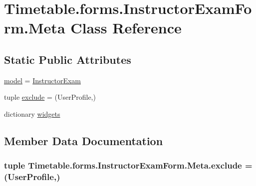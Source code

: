 \hypertarget{classTimetable_1_1forms_1_1InstructorExamForm_1_1Meta}{}\section{Timetable.\+forms.\+Instructor\+Exam\+Form.\+Meta Class Reference}
\label{classTimetable_1_1forms_1_1InstructorExamForm_1_1Meta}
\subsection*{Static Public Attributes}
\begin{DoxyCompactItemize}
\item 
\hyperlink{classTimetable_1_1forms_1_1InstructorExamForm_1_1Meta_a34a1ffa63c45106f0bd42087cdd17b5c}{model} = \hyperlink{classTimetable_1_1models_1_1InstructorExam}{Instructor\+Exam}
\item 
tuple \hyperlink{classTimetable_1_1forms_1_1InstructorExamForm_1_1Meta_adcd50d8708b6b512b420b85350d070b9}{exclude} = (\textquotesingle{}User\+Profile\textquotesingle{},)
\item 
dictionary \hyperlink{classTimetable_1_1forms_1_1InstructorExamForm_1_1Meta_a465e32885f71d0c5718e8d2d9836af9b}{widgets}
\end{DoxyCompactItemize}


\subsection{Member Data Documentation}
\subsubsection[{\texorpdfstring{exclude}{exclude}}]{\setlength{\rightskip}{0pt plus 5cm}tuple Timetable.\+forms.\+Instructor\+Exam\+Form.\+Meta.\+exclude = (\textquotesingle{}User\+Profile\textquotesingle{},)\hspace{0.3cm}{\ttfamily [static]}}\hypertarget{classTimetable_1_1forms_1_1InstructorExamForm_1_1Meta_adcd50d8708b6b512b420b85350d070b9}{}\label{classTimetable_1_1forms_1_1InstructorExamForm_1_1Meta_adcd50d8708b6b512b420b85350d070b9}
